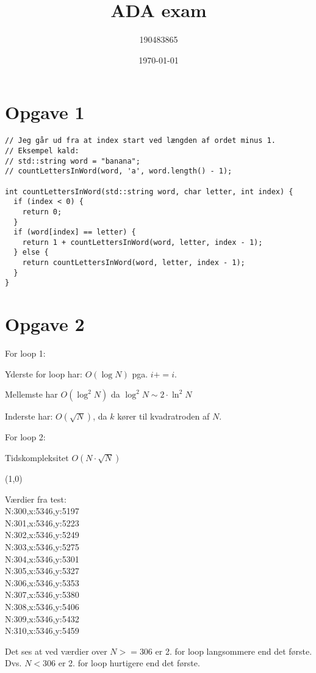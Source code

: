 \documentclass{article}
\title{ADA exam}
\author{190483865}
\date{\today}
\begin{document}
\maketitle
\tableofcontents
\newpage

\section{Opgave 1}
\begin{verbatim}
// Jeg går ud fra at index start ved længden af ordet minus 1.
// Eksempel kald:
// std::string word = "banana";
// countLettersInWord(word, 'a', word.length() - 1);

int countLettersInWord(std::string word, char letter, int index) {
  if (index < 0) {
    return 0;
  }
  if (word[index] == letter) {
    return 1 + countLettersInWord(word, letter, index - 1);
  } else {
    return countLettersInWord(word, letter, index - 1);
  }
}
\end{verbatim}

\section{Opgave 2}
For loop 1:

Yderste for loop har: $O(\log{N})$ pga. $i+=i$.

Mellemste har $O({\log^2{N}})$ da ${\log^2{N}}\sim 2\cdot{\ln^2{N}}$

Inderste har: $O(\sqrt{N})$, da $k$ kører til kvadratroden af $N$.

For loop 2:

Tidskompleksitet $O(N\cdot \sqrt{N})$

\line(1,0){\textwidth}

Værdier fra test:\\
N:300,x:5346,y:5197\\
N:301,x:5346,y:5223\\
N:302,x:5346,y:5249\\
N:303,x:5346,y:5275\\
N:304,x:5346,y:5301\\
N:305,x:5346,y:5327\\
N:306,x:5346,y:5353\\
N:307,x:5346,y:5380\\
N:308,x:5346,y:5406\\
N:309,x:5346,y:5432\\
N:310,x:5346,y:5459

Det ses at ved værdier over $N>=306$ er 2. for loop langsommere end det første. 
Dvs. $N<306$ er 2. for loop hurtigere end det første. 
\end{document}
